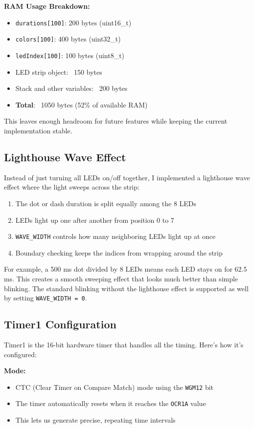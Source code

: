 \documentclass[report]{IEEEtran}
\begin{document}
\textbf{RAM Usage Breakdown:}
\begin{itemize}
    \item \texttt{durations[100]}: 200 bytes (uint16\_t)
    \item \texttt{colors[100]}: 400 bytes (uint32\_t)
    \item \texttt{ledIndex[100]}: 100 bytes (uint8\_t)
    \item LED strip object: ~150 bytes
    \item Stack and other variables: ~200 bytes
    \item \textbf{Total}: ~1050 bytes (52\% of available RAM)
\end{itemize}

This leaves enough headroom for future features while keeping the current implementation stable.

\subsection{Lighthouse Wave Effect}
Instead of just turning all LEDs on/off together, I implemented a lighthouse wave effect where the light sweeps across the strip:
\begin{enumerate}
    \item The dot or dash duration is split equally among the 8 LEDs
    \item LEDs light up one after another from position 0 to 7
    \item \texttt{WAVE\_WIDTH} controls how many neighboring LEDs light up at once
    \item Boundary checking keeps the indices from wrapping around the strip
\end{enumerate}

For example, a 500 ms dot divided by 8 LEDs means each LED stays on for 62.5 ms. 
This creates a smooth sweeping effect that looks much better than simple blinking. 
The standard blinking without the lighthouse effect is supported as well by setting \texttt{WAVE\_WIDTH = 0}. 

\subsection{Timer1 Configuration}
Timer1 is the 16-bit hardware timer that handles all the timing. Here's how it's configured:

\textbf{Mode:}
\begin{itemize}
    \item CTC (Clear Timer on Compare Match) mode using the \texttt{WGM12} bit
    \item The timer automatically resets when it reaches the \texttt{OCR1A} value
    \item This lets us generate precise, repeating time intervals
\end{itemize}
\end{document}
